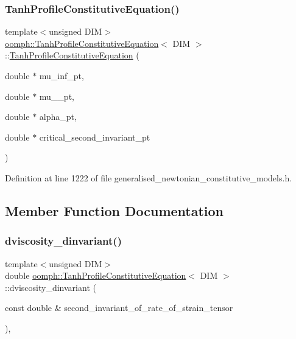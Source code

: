 \subsubsection{\texorpdfstring{Tanh\+Profile\+Constitutive\+Equation()}{TanhProfileConstitutiveEquation()}}
{\footnotesize\ttfamily template$<$unsigned D\+IM$>$ \\
\hyperlink{classoomph_1_1TanhProfileConstitutiveEquation}{oomph\+::\+Tanh\+Profile\+Constitutive\+Equation}$<$ D\+IM $>$\+::\hyperlink{classoomph_1_1TanhProfileConstitutiveEquation}{Tanh\+Profile\+Constitutive\+Equation} (\begin{DoxyParamCaption}\item[{double $\ast$}]{mu\+\_\+inf\+\_\+pt,  }\item[{double $\ast$}]{mu\+\_\+\_\+pt,  }\item[{double $\ast$}]{alpha\+\_\+pt,  }\item[{double $\ast$}]{critical\+\_\+second\+\_\+invariant\+\_\+pt }\end{DoxyParamCaption})\hspace{0.3cm}{\ttfamily [inline]}}



Definition at line 1222 of file generalised\+\_\+newtonian\+\_\+constitutive\+\_\+models.\+h.



\subsection{Member Function Documentation}
\mbox{\label{classoomph_1_1TanhProfileConstitutiveEquation_a5151261b6ec1c3f29f7ee085db955c2f}} 
\subsubsection{\texorpdfstring{dviscosity\+\_\+dinvariant()}{dviscosity\_dinvariant()}}
{\footnotesize\ttfamily template$<$unsigned D\+IM$>$ \\
double \hyperlink{classoomph_1_1TanhProfileConstitutiveEquation}{oomph\+::\+Tanh\+Profile\+Constitutive\+Equation}$<$ D\+IM $>$\+::dviscosity\+\_\+dinvariant (\begin{DoxyParamCaption}\item[{const double \&}]{second\+\_\+invariant\+\_\+of\+\_\+rate\+\_\+of\+\_\+strain\+\_\+tensor }\end{DoxyParamCaption})\hspace{0.3cm}{\ttfamily [inline]}, {\ttfamily [virtual]}}

